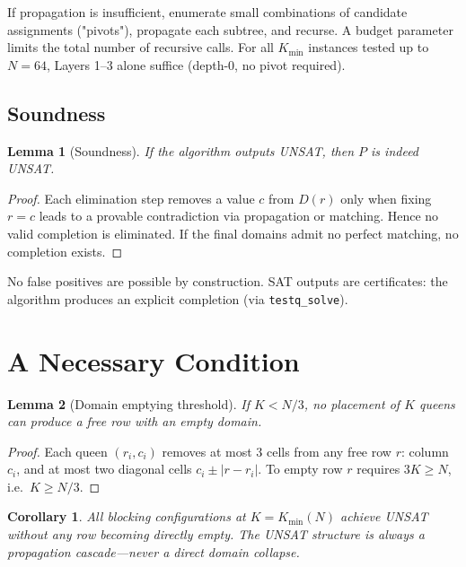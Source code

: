 \documentclass[11pt]{article}
\newtheorem{lemma}{Lemma}
\newtheorem{corollary}{Corollary}
\begin{document}
If propagation is insufficient, enumerate small combinations of candidate
assignments ("pivots"), propagate each subtree, and recurse.
A budget parameter limits the total number of recursive calls.
For all $K_{\min}$ instances tested up to $N = 64$, Layers 1--3 alone suffice
(depth-0, no pivot required).

\subsection{Soundness}

\begin{lemma}[Soundness]
If the algorithm outputs UNSAT, then $P$ is indeed UNSAT.
\end{lemma}

\begin{proof}
Each elimination step removes a value $c$ from $D(r)$ only when fixing $r = c$
leads to a provable contradiction via propagation or matching.
Hence no valid completion is eliminated. If the final domains admit no perfect
matching, no completion exists.
\end{proof}

No false positives are possible by construction. SAT outputs are certificates:
the algorithm produces an explicit completion (via \texttt{testq\_solve}).

\section{A Necessary Condition}

\begin{lemma}[Domain emptying threshold]
\label{lem:threshold}
If $K < N/3$, no placement of $K$ queens can produce a free row with an
empty domain.
\end{lemma}

\begin{proof}
Each queen $(r_i, c_i)$ removes at most 3 cells from any free row $r$:
column $c_i$, and at most two diagonal cells $c_i \pm |r - r_i|$.
To empty row $r$ requires $3K \geq N$, i.e.\ $K \geq N/3$.
\end{proof}

\begin{corollary}
All blocking configurations at $K = K_{\min}(N)$ achieve UNSAT without any
row becoming directly empty. The UNSAT structure is always a propagation
cascade---never a direct domain collapse.
\end{corollary}
\end{document}
